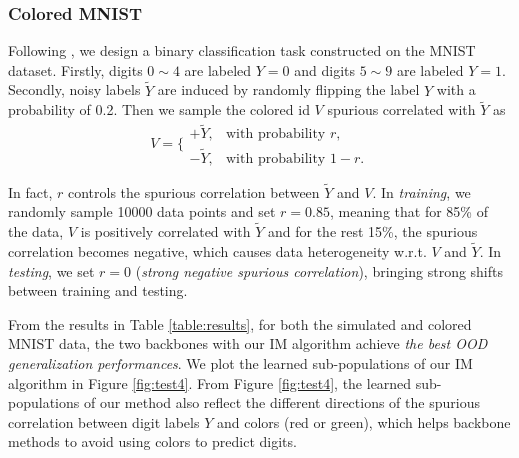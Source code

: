 \subsubsection{Colored MNIST}
Following \cite{arjovsky2019invariant}, we design a binary classification task constructed on the MNIST dataset.
Firstly, digits $0\sim4$ are labeled $Y=0$ and digits $5\sim 9$ are labeled $Y=1$. 
Secondly, noisy labels $\tilde{Y}$ are induced by randomly flipping the label $Y$ with a probability of 0.2.
Then we sample the colored id $V$ spurious correlated with $\tilde{Y}$ as 
\begin{equation}
	V=\Big\{\begin{array}{ll}
     +\tilde{Y}, &\text{with probability }r,  \\
     -\tilde{Y}, &\text{with probability }1-r.
\end{array}
\end{equation}

In fact, $r$ controls the spurious correlation between $\tilde{Y}$ and $V$. 
In \emph{training}, we randomly sample 10000 data points and set $r=0.85$, meaning that for 85\% of the data, $V$ is positively correlated with $\tilde{Y}$ and for the rest 15\%, the spurious correlation becomes negative, which causes data heterogeneity w.r.t. $V$ and $\tilde{Y}$.
In \emph{testing}, we set $r=0$ (\emph{strong negative spurious correlation}), bringing strong shifts between training and testing.

From the results in Table \ref{table:results}, for both the simulated and colored MNIST data, the two backbones with our IM algorithm achieve \emph{the best OOD generalization performances}.
We plot the learned sub-populations of our IM algorithm in Figure \ref{fig:test4}.
From Figure \ref{fig:test4}, the learned sub-populations of our method also reflect the different directions of the spurious correlation between digit labels $Y$ and colors (red or green), which helps backbone methods to avoid using colors to predict digits.






















